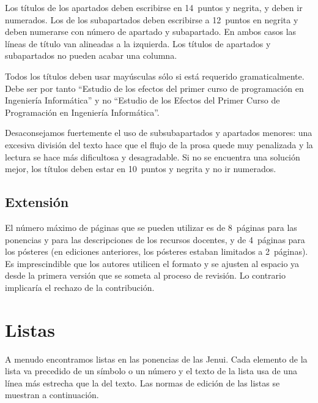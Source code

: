 \documentclass[twocolumn,twoside,a4paper, 10pt]{article}
\begin{document}
Los títulos de los apartados deben escribirse en 14~puntos y negrita, y 
deben ir numerados. Los de los subapartados deben escribirse a 12~puntos 
en negrita y deben numerarse con número de apartado y 
subapartado. En ambos casos las líneas de título van alineadas a la 
izquierda. Los títulos de apartados y subapartados no pueden acabar 
una columna.

Todos los títulos deben usar mayúsculas sólo si está requerido
gramaticalmente.  Debe ser por tanto ``Estudio de los efectos del
primer curso de programación en Ingeniería Informática'' y no
``Estudio de los Efectos del Primer Curso de Programación en
Ingeniería Informática''.

Desaconsejamos fuertemente el uso de subsubapartados y apartados
menores: una excesiva división del texto hace que el flujo de la prosa
quede muy penalizada y la lectura se hace más dificultosa y
desagradable.  Si no se encuentra una solución mejor, los títulos
deben estar en 10~puntos y negrita y no ir numerados.

\subsection{Extensión}

El número máximo de páginas que se pueden utilizar es de 8~páginas para las ponencias 
y para las descripciones de los recursos docentes, y de 4~páginas para los pósteres 
(en ediciones anteriores, los pósteres estaban limitados a 2~páginas). 
Es imprescindible que los autores utilicen el formato y se ajusten al espacio ya 
desde la primera versión que se someta al proceso de revisión. Lo contrario implicaría 
el rechazo de la contribución.

\section{Listas}

A menudo encontramos listas en las ponencias de las Jenui. 
Cada elemento de la lista va precedido de un símbolo o un número y 
el texto de la lista usa de una línea más estrecha que la del texto. 
Las normas de edición de las listas se muestran a continuación.
\end{document}
